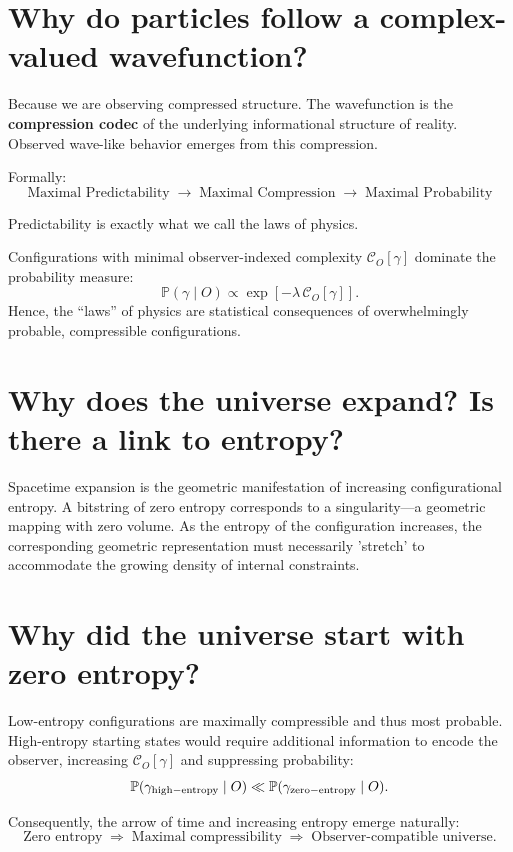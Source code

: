 \section*{Why do particles follow a complex-valued wavefunction?}

Because we are observing compressed structure.
The wavefunction is the \textbf{compression codec} of the underlying informational structure of reality.
Observed wave-like behavior emerges from this compression.

Formally:
\[
\boxed{\text{Maximal Predictability}} \;\rightarrow\; \boxed{\text{Maximal Compression}} \;\rightarrow\; \boxed{\text{Maximal Probability}} 
\]

Predictability is exactly what we call the laws of physics.

Configurations with minimal observer-indexed complexity \( \mathcal{C}_O[\gamma] \) dominate the probability measure:
\[
\mathbb{P}(\gamma \mid O) \propto \exp[-\lambda \, \mathcal{C}_O[\gamma]].
\]
Hence, the ``laws'' of physics are statistical consequences of overwhelmingly probable, compressible configurations.


\section*{Why does the universe expand? Is there a link to entropy?}

Spacetime expansion is the geometric manifestation of increasing configurational entropy. A bitstring of zero entropy corresponds to a singularity—a geometric mapping with zero volume. As the entropy of the configuration increases, the corresponding geometric representation must necessarily 'stretch' to accommodate the growing density of internal constraints.


\section*{Why did the universe start with zero entropy?}

Low-entropy configurations are maximally compressible and thus most probable.
High-entropy starting states would require additional information to encode the observer, increasing \( \mathcal{C}_O[\gamma] \) and suppressing probability:
\[
\mathbb{P}(\gamma_{\rm high-entropy} \mid O) \ll \mathbb{P}(\gamma_{\rm zero-entropy} \mid O).
\]

Consequently, the arrow of time and increasing entropy emerge naturally:
\[
\text{Zero entropy} \;\Rightarrow\; \text{Maximal compressibility} \;\Rightarrow\; \text{Observer-compatible universe}.
\]

